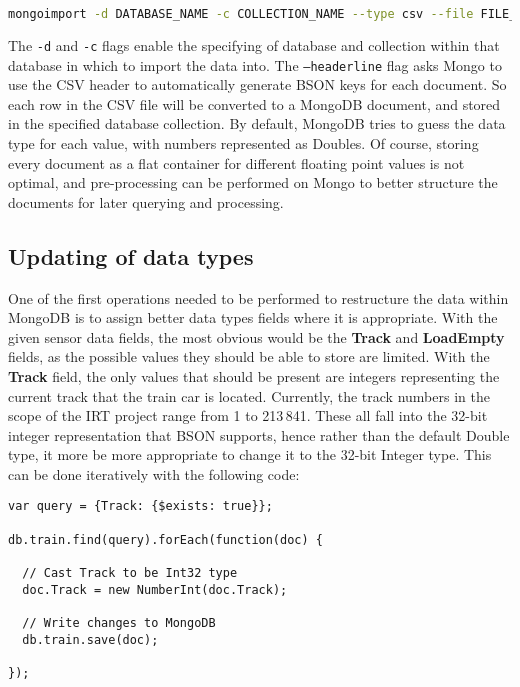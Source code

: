 \documentclass[a4paper,11pt]{article}
\begin{document}
\begin{lstlisting}[language=bash]
mongoimport -d DATABASE_NAME -c COLLECTION_NAME --type csv --file FILE_NAME.csv --headerline --ignoreBlanks
\end{lstlisting}

The \texttt{-d} and \texttt{-c} flags enable the specifying of database and collection within that database in which to
import the data into. The \texttt{--headerline} flag asks Mongo to use the CSV header to automatically generate BSON
keys for each document. So each row in the CSV file will be converted to a MongoDB document, and stored in the specified
database collection. By default, MongoDB tries to guess the data type for each value, with numbers represented as Doubles.
Of course, storing every document as a flat container for different floating point values is not optimal, and pre-processing
can be performed on Mongo to better structure the documents for later querying and processing.



\subsection{Updating of data types} %
\label{sub:restructuring_of_data}

One of the first operations needed to be performed to restructure the data within MongoDB is to assign better data types
fields where it is appropriate. With the given sensor data fields, the most obvious would be the \textbf{Track} and
\textbf{LoadEmpty} fields, as the possible values they should be able to store are limited. With the \textbf{Track} field,
the only values that should be present are integers representing the current track that the train car is located. Currently,
the track numbers in the scope of the IRT project range from 1 to 213\,841. These all fall into the 32-bit integer representation
that BSON supports, hence rather than the default Double type, it more be more appropriate to change it to the 32-bit Integer
type. This can be done iteratively with the following code:

\begin{lstlisting}
var query = {Track: {$exists: true}};

db.train.find(query).forEach(function(doc) {

  // Cast Track to be Int32 type
  doc.Track = new NumberInt(doc.Track);

  // Write changes to MongoDB
  db.train.save(doc);

});
\end{lstlisting}
\end{document}
